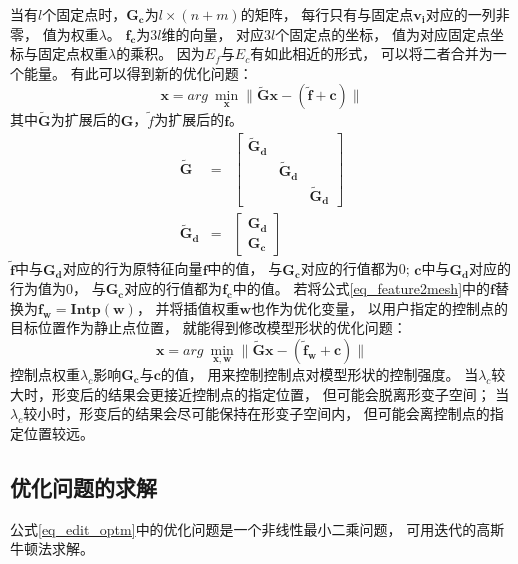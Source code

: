 当有$l$个固定点时，$\bm{G_c}$为$l \times (n+m)$的矩阵，
每行只有与固定点$\bm{v_i}$对应的一列非零，
值为权重$\lambda$。
$\bm{f_c}$为$3l$维的向量，
对应$3l$个固定点的坐标，
值为对应固定点坐标与固定点权重$\lambda$的乘积。
因为$E_f$与$E_c$有如此相近的形式，
可以将二者合并为一个能量。
有此可以得到新的优化问题：
\begin{equation}
    \label{eq_feature2mesh}
    \bm{x}=arg\ \min_{\bm{x}} \| \bm{\widetilde{G}x}-(\widetilde{\bm{f}}+\bm{c}) \|
\end{equation}
其中$\bm{\widetilde{G}}$为扩展后的$\bm{G}$，$\widetilde{f}$为扩展后的$\bm{f}$。
\begin{eqnarray}
    \bm{\widetilde{G}}&=&
    \begin{bmatrix}
        \bm{\widetilde{G}_d} &        & \\ 
         &       \bm{\widetilde{G}_d} & \\ 
         &       &                  \bm{\widetilde{G}_d}
    \end{bmatrix}\\
    \bm{\widetilde{G}_d}&=&
    \begin{bmatrix}
        \bm{G_d} \\ 
        \bm{G_c}
    \end{bmatrix}
\end{eqnarray}
$\widetilde{\bm{f}}$中与$\bm{G_d}$对应的行为原特征向量$\bm{f}$中的值，
与$\bm{\bm{G_c}}$对应的行值都为0;
$\bm{c}$中与$\bm{G_d}$对应的行为值为0，
与$\bm{\bm{G_c}}$对应的行值都为$\bm{f_c}$中的值。
若将公式\ref{eq_feature2mesh}中的$\bm{f}$替换为$\bm{f_w}=\bm{Intp}(\bm{w})$，
并将插值权重$\bm{w}$也作为优化变量，
以用户指定的控制点的目标位置作为静止点位置，
就能得到修改模型形状的优化问题：
\begin{equation}
    \label{eq_edit_optm}
    \bm{x}=arg\ \min_{\bm{x},\bm{w}}
    \|
        \widetilde{\bm{G}}\bm{x} 
        -
        (\widetilde{\bm{f}}_{\bm{w}}+\bm{c}) 
    \|
\end{equation}
控制点权重$\lambda_c$影响$\bm{G_c}$与$\bm{c}$的值，
用来控制控制点对模型形状的控制强度。
当$\lambda_c$较大时，形变后的结果会更接近控制点的指定位置，
但可能会脱离形变子空间；
当$\lambda_c$较小时，形变后的结果会尽可能保持在形变子空间内，
但可能会离控制点的指定位置较远。
\subsection{优化问题的求解}
公式\ref{eq_edit_optm}中的优化问题是一个非线性最小二乘问题，
可用迭代的高斯牛顿法求解。

